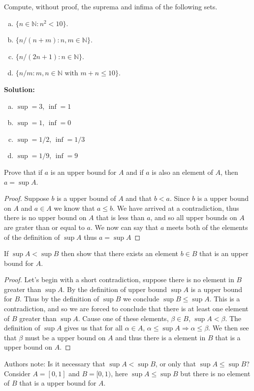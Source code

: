 \documentclass[12pt]{article}
\makeatletter
\theoremstyle{homework}
\newenvironment{exercise}[1]
{\def\@currentlabel{#1}\exercisecore}
{\endexercisecore}
\newcommand{\localhead}[1]{\par\smallskip\noindent\textbf{#1}\nobreak\\}%
\newcommand\solution{\localhead{Solution:}}
\newcommand{\Nats}{\ensuremath{\mathbb N}}
\makeatother
\begin{document}
\begin{exercise}{1.3.6} Compute, without proof, the suprema and infima of the 
following sets.
\begin{enumerate}[(a)]
\item $\{n\in\Nats: n^2<10\}$.
\item $\{n/(n+m): n,m\in\Nats\}$.
\item $\{n/(2n+1): n\in\Nats\}$.
\item $\{n/m: \text{$m,n\in\Nats$ with $m+n\le 10$}\}$.
\end{enumerate}
\end{exercise}
\solution
\begin{enumerate}[(a)]
\item $\sup=3$, $\inf=1$
\item $\sup=1$, $\inf=0$
\item $\sup=1/2$, $\inf=1/3$
\item $\sup=1/9$, $\inf=9$
\end{enumerate}

\begin{exercise}{1.3.7} Prove that if $a$ is an upper bound for $A$ and if $a$ is also an element of $A$,
then $a=\sup A$.
\end{exercise}
\begin{proof}
Suppose $b$ is a upper bound of $A$ and that $b<a$.  Since $b$ is a upper bound on $A$ and $a\in A$ we know that $a\le b$.  We have arrived at a contradiction, thus there is no upper bound on $A$ that is less than $a$, and so all upper bounds on $A$ are grater than or equal to $a$.  We now can say that $a$ meets both of the elements of the definition of $\sup A$ thus $a=\sup A$
\end{proof}

\begin{exercise}{1.3.8}  If $\sup A < \sup B$ then show that there exists an element $b\in B$ that is an upper bound for $A$.
\end{exercise}
\begin{proof}
Let's begin with a short contradiction, suppose there is no element in $B$ greater than $\sup A$.  By the definition of upper bound $\sup A$ is a upper bound for $B$.  Thus by the definition of $\sup B$ we conclude $\sup B\le \sup A$.  This is a contradiction, and so we are forced to conclude that there is at least one element of $B$ greater than $\sup A$.  Cause one of these elements, $\beta \in B$, $\sup A<\beta$.  The definition of $\sup A$ gives us that for all $\alpha \in A$, $\alpha\le \sup A\Rightarrow \alpha\le \beta$.  We then see that $\beta$ must be a upper bound on $A$ and thus there is a element in $B$ that is a upper bound on $A$.
\end{proof}
Authors note: Is it necessary that $\sup A < \sup B$, or only that $\sup A \le \sup B$?  Consider $A=[0,1]$ and $B=[0,1)$, here $\sup A \le \sup B$ but there is no element of $B$ that is a upper bound for $A$.
\end{document}
